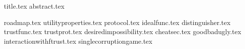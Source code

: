 \documentclass[11pt]{llncs}
\begin{document}
{title.tex}
\thispagestyle{plain}
{abstract.tex}

{roadmap.tex}
{utilityproperties.tex}
{protocol.tex}
{idealfunc.tex}
{distinguisher.tex}
{trustfunc.tex}
{trustprot.tex}
{desiredimpossibility.tex}
{cheatsec.tex}
{goodbadugly.tex}
{interactionwithftrust.tex}
{singlecorruptiongame.tex}

\end{document}
